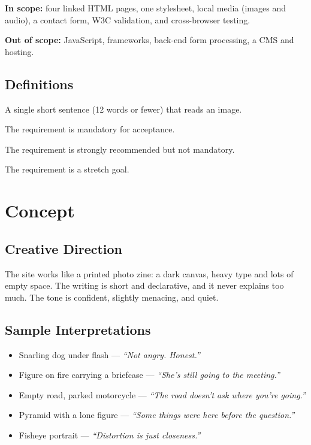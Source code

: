 \documentclass[11pt,a4paper]{article}
\begin{document}
\textbf{In scope:} four linked HTML pages, one stylesheet, local media (images and audio),
a contact form, W3C validation, and cross-browser testing.

\textbf{Out of scope:} JavaScript, frameworks, back-end form processing, a CMS and hosting.

\subsection{Definitions}
\begin{description}[leftmargin=2.5cm, style=nextline]
  \item[Interpretation] A single short sentence (12 words or fewer) that reads an image.
  \item[MUST] The requirement is mandatory for acceptance.
  \item[SHOULD] The requirement is strongly recommended but not mandatory.
  \item[COULD] The requirement is a stretch goal.
\end{description}

\section{Concept}

\subsection{Creative Direction}
The site works like a printed photo zine: a dark canvas, heavy type and lots of empty
space. The writing is short and declarative, and it never explains too much. The tone is
confident, slightly menacing, and quiet.

\subsection{Sample Interpretations}
\begin{itemize}
  \item Snarling dog under flash --- \textit{``Not angry. Honest.''}
  \item Figure on fire carrying a briefcase --- \textit{``She's still going to the meeting.''}
  \item Empty road, parked motorcycle --- \textit{``The road doesn't ask where you're going.''}
  \item Pyramid with a lone figure --- \textit{``Some things were here before the question.''}
  \item Fisheye portrait --- \textit{``Distortion is just closeness.''}
\end{itemize}
\end{document}
